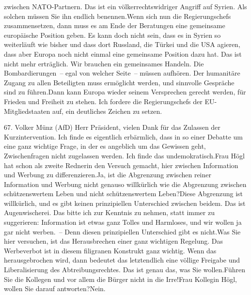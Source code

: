 \documentclass{article}
\begin{document}
zwischen NATO-Partnern. Das ist ein völkerrechtswidriger Angriff auf Syrien. Als solchen müssen Sie ihn endlich benennen.Wenn sich nun die Regierungschefs zusammensetzen, dann muss es am Ende der Beratungen eine gemeinsame europäische Position geben. Es kann doch nicht sein, dass es in Syrien so weiterläuft wie bisher und dass dort Russland, die Türkei und die USA agieren, dass aber Europa noch nicht einmal eine gemeinsame Position dazu hat. Das ist nicht mehr erträglich. Wir brauchen ein gemeinsames Handeln. Die Bombardierungen – egal von welcher Seite – müssen aufhören. Der humanitäre Zugang zu allen Beteiligten muss ermöglicht werden, und sinnvolle Gespräche sind zu führen.Dann kann Europa wieder seinem Versprechen gerecht werden, für Frieden und Freiheit zu stehen. Ich fordere die Regierungschefs der EU-Mitgliedstaaten auf, ein deutliches Zeichen zu setzen.




	67. Volker Münz (AfD) Herr Präsident, vielen Dank für das Zulassen der Kurzintervention. Ich finde es eigentlich erbärmlich, dass in so einer Debatte um eine ganz wichtige Frage, in der es angeblich um das Gewissen geht, Zwischenfragen nicht zugelassen werden. Ich finde das undemokratisch.Frau Högl hat schon als zweite Rednerin den Versuch gemacht, hier zwischen Information und Werbung zu differenzieren.Ja, ist die Abgrenzung zwischen reiner Information und Werbung nicht genauso willkürlich wie die Abgrenzung zwischen schützenswertem Leben und nicht schützenswertem Leben?Diese Abgrenzung ist willkürlich, und es gibt keinen prinzipiellen Unterschied zwischen beidem. Das ist Augenwischerei. Das bitte ich zur Kenntnis zu nehmen, statt immer zu suggerieren: Information ist etwas ganz Tolles und Harmloses, und wir wollen ja gar nicht werben. – Denn diesen prinzipiellen Unterschied gibt es nicht.Was Sie hier versuchen, ist das Herausbrechen einer ganz wichtigen Regelung. Das Werbeverbot ist in diesem filigranen Konstrukt ganz wichtig. Wenn das herausgebrochen wird, dann bedeutet das letztendlich eine völlige Freigabe und Liberalisierung des Abtreibungsrechtes. Das ist genau das, was Sie wollen.Führen Sie die Kollegen und vor allem die Bürger nicht in die Irre!Frau Kollegin Högl, wollen Sie darauf antworten?Nein.
\end{document}
